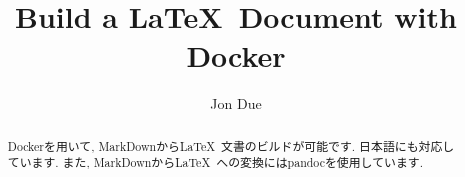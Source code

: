 \documentclass[a4paper]{jsarticle}
\title{Build a \LaTeX\ Document with Docker}
\author{Jon Due}
\begin{document}
\maketitle

\begin{abstract}
    Dockerを用いて, MarkDownから\LaTeX\ 文書のビルドが可能です. 日本語にも対応しています.
    また, MarkDownから\LaTeX\ への変換にはpandocを使用しています.
\end{abstract}


    
\end{document}
